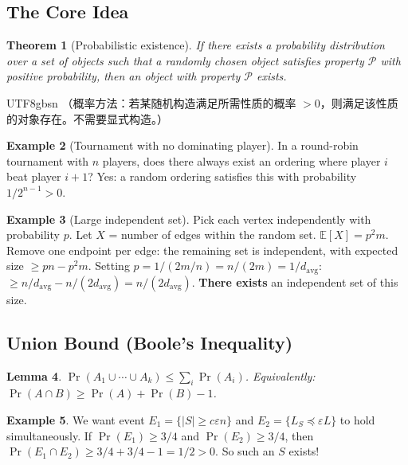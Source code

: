 \documentclass[12pt]{article}
\newtheorem{theorem}{Theorem}[section]
\newtheorem{lemma}[theorem]{Lemma}
\theoremstyle{definition}
\newtheorem{example}[theorem]{Example}
\theoremstyle{remark}
\begin{document}
\subsection{The Core Idea}

\begin{theorem}[Probabilistic existence]
If there exists a probability distribution over a set of objects such that a
randomly chosen object satisfies property $\mathcal{P}$ with positive probability,
then an object with property $\mathcal{P}$ exists.
\end{theorem}

\begin{CJK}{UTF8}{gbsn}
（概率方法：若某随机构造满足所需性质的概率 $> 0$，则满足该性质的对象存在。不需要显式构造。）
\end{CJK}

\begin{example}[Tournament with no dominating player]
In a round-robin tournament with $n$ players, does there always exist an ordering
where player $i$ beat player $i+1$?  Yes: a random ordering satisfies this with
probability $1/2^{n-1} > 0$.
\end{example}

\begin{example}[Large independent set]
Pick each vertex independently with probability $p$.  Let $X$ = number of edges
within the random set.  $\mathbb{E}[X] = p^2 m$.  Remove one endpoint per edge:
the remaining set is independent, with expected size $\ge p n - p^2 m$.
Setting $p = 1/(2m/n) = n/(2m) = 1/d_{\mathrm{avg}}$:
$\ge n/d_{\mathrm{avg}} - n/(2d_{\mathrm{avg}}) = n/(2d_{\mathrm{avg}})$.
\textbf{There exists} an independent set of this size.
\end{example}

\subsection{Union Bound (Boole's Inequality)}

\begin{lemma}
$\Pr(A_1 \cup \cdots \cup A_k) \le \sum_i \Pr(A_i)$.
Equivalently: $\Pr(A \cap B) \ge \Pr(A) + \Pr(B) - 1$.
\end{lemma}

\begin{example}
We want event $E_1 = \{|S| \ge c\varepsilon n\}$ and $E_2 = \{L_S \preceq \varepsilon L\}$ to hold simultaneously.
If $\Pr(E_1) \ge 3/4$ and $\Pr(E_2) \ge 3/4$, then
$\Pr(E_1 \cap E_2) \ge 3/4 + 3/4 - 1 = 1/2 > 0$.
So such an $S$ exists!
\end{example}
\end{document}
